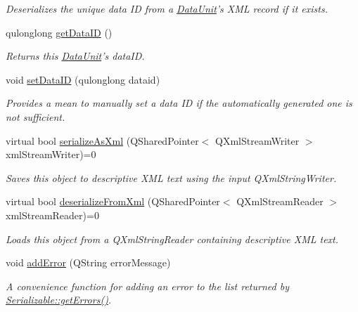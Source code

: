 \begin{DoxyCompactItemize}
\begin{DoxyCompactList}\small\item\em Deserializes the unique data I\-D from a \hyperlink{class_picto_1_1_data_unit}{Data\-Unit}'s X\-M\-L record if it exists. \end{DoxyCompactList}\item 
\hypertarget{class_picto_1_1_data_unit_aa49e53f00131a2ad4a8029094176ff25}{qulonglong \hyperlink{class_picto_1_1_data_unit_aa49e53f00131a2ad4a8029094176ff25}{get\-Data\-I\-D} ()}\label{class_picto_1_1_data_unit_aa49e53f00131a2ad4a8029094176ff25}

\begin{DoxyCompactList}\small\item\em Returns this \hyperlink{class_picto_1_1_data_unit}{Data\-Unit}'s data\-I\-D. \end{DoxyCompactList}\item 
\hypertarget{class_picto_1_1_data_unit_ab26ae35496fca14aeb25d476f1e52e11}{void \hyperlink{class_picto_1_1_data_unit_ab26ae35496fca14aeb25d476f1e52e11}{set\-Data\-I\-D} (qulonglong dataid)}\label{class_picto_1_1_data_unit_ab26ae35496fca14aeb25d476f1e52e11}

\begin{DoxyCompactList}\small\item\em Provides a mean to manually set a data I\-D if the automatically generated one is not sufficient. \end{DoxyCompactList}\item 
virtual bool \hyperlink{class_picto_1_1_data_unit_a72923bddebee1127470ef9e8face7d3a}{serialize\-As\-Xml} (Q\-Shared\-Pointer$<$ Q\-Xml\-Stream\-Writer $>$ xml\-Stream\-Writer)=0
\begin{DoxyCompactList}\small\item\em Saves this object to descriptive X\-M\-L text using the input Q\-Xml\-String\-Writer. \end{DoxyCompactList}\item 
virtual bool \hyperlink{class_picto_1_1_data_unit_a44ba3155a80dee6c504300b877e944d8}{deserialize\-From\-Xml} (Q\-Shared\-Pointer$<$ Q\-Xml\-Stream\-Reader $>$ xml\-Stream\-Reader)=0
\begin{DoxyCompactList}\small\item\em Loads this object from a Q\-Xml\-String\-Reader containing descriptive X\-M\-L text. \end{DoxyCompactList}\item 
void \hyperlink{class_picto_1_1_data_unit_aef1d278fcea7506669220c9a4f0ccb2d}{add\-Error} (Q\-String error\-Message)
\begin{DoxyCompactList}\small\item\em A convenience function for adding an error to the list returned by \hyperlink{class_picto_1_1_serializable_a9b14c771646820d10e082d351cd4cf50}{Serializable\-::get\-Errors()}. \end{DoxyCompactList}\end{DoxyCompactItemize}
